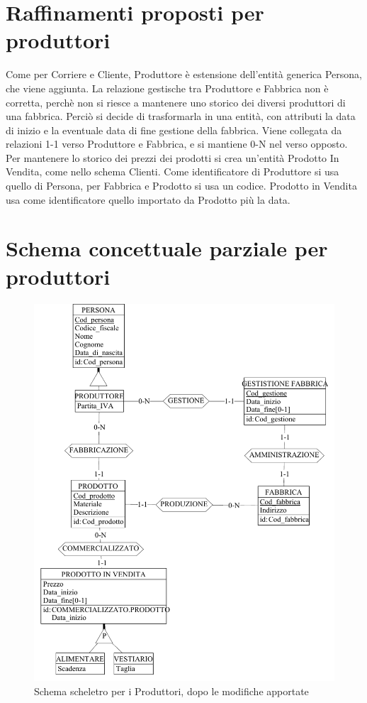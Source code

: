 \documentclass[a4paper,12pt]{report}
\begin{document}
\section{Raffinamenti proposti per produttori}
Come per Corriere e Cliente, Produttore è estensione dell'entità generica Persona, che viene aggiunta. 
La relazione gestische tra Produttore e Fabbrica non è corretta, perchè non si riesce a mantenere uno storico dei diversi produttori di una fabbrica.
Perciò si decide di trasformarla in una entità, con attributi la data di inizio e la eventuale data di fine gestione della fabbrica. Viene collegata da relazioni 1-1 verso Produttore e Fabbrica, e si mantiene 0-N nel verso opposto.
Per mantenere lo storico dei prezzi dei prodotti si crea un'entità Prodotto In Vendita, come nello schema Clienti.
Come identificatore di Produttore si usa quello di Persona, per Fabbrica e Prodotto si usa un codice. Prodotto in Vendita usa come identificatore quello importato da Prodotto più la data.
\section{Schema concettuale parziale per produttori}
\begin{figure}[h]
	\centering{}
	\includegraphics[width=\textwidth]{img/SchemaConcettuale-Produttori2.pdf}
	\caption{Schema scheletro per i Produttori, dopo le modifiche apportate}
\end{figure}
\end{document}

